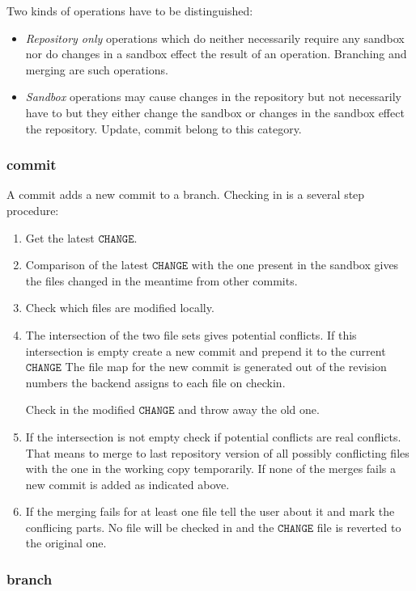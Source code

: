 \documentclass[fleqn, 10pt, a4paper]{report} \usepackage{amssymb}
\begin{document}
Two kinds of operations have to be distinguished:
\begin{itemize}
\item \emph{Repository only} operations which do neither necessarily
  require any sandbox nor do changes in a sandbox effect the result of
  an operation.  Branching and merging are such operations.
\item \emph{Sandbox} operations may cause changes in the repository
  but not necessarily have to but they either change the sandbox or
  changes in the sandbox effect the repository. Update, commit belong
  to this category.
\end{itemize}


\subsubsection{commit}

A commit adds a new commit to a branch. Checking in is a several step
procedure:

\begin{enumerate}
\item Get the latest $\mathtt{CHANGE}$.
\item Comparison of the latest $\mathtt{CHANGE}$ with the one present
  in the sandbox gives the files changed in the meantime from other
  commits.
\item Check which files are modified locally.
\item The intersection of the two file sets gives potential conflicts.
  If this intersection is empty create a new commit and prepend it to
  the current $\mathtt{CHANGE}$ The file map for the new commit is
  generated out of the revision numbers the backend assigns to each
  file on checkin.

  Check in the modified $\mathtt{CHANGE}$ and throw away the old one.
\item If the intersection is not empty check if potential conflicts
  are real conflicts. That means to merge to last repository version
  of all possibly conflicting files with the one in the working copy
  temporarily. If none of the merges fails a new commit is added as
  indicated above.
\item If the merging fails for at least one file tell the user about
  it and mark the conflicing parts. No file will be checked in and the
  $\mathtt{CHANGE}$ file is reverted to the original one.
\end{enumerate}


\subsubsection{branch}
\end{document}
